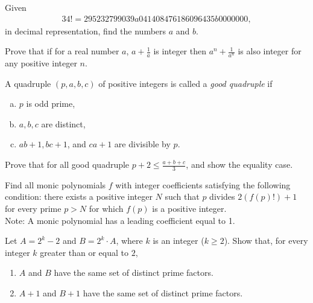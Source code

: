 \documentclass[problems.tex]{subfile}
\begin{document}
	
	
	\begin{problem}
		Given  
		\begin{align*}
			34!=295232799039a041408476186096435b0000000,
		\end{align*}
		in decimal representation, find the numbers $a$ and $b$. %
	\end{problem}
	
	
	
	\begin{problem}
		Prove that if for a real number $a $, $a+\frac {1}{a} $ is integer then $a^n+\frac {1}{a^n} $ is also integer for any positive integer $n$. %
	\end{problem}
	
	
	
	\begin{problem}
		A quadruple $(p,a,b,c)$ of positive integers is called a \textit{good quadruple} if 
		\begin{enumerate}[(a)]
			\item $p $ is odd prime,
			\item $a,b,c $ are distinct,
			\item $ab+1,bc+1$, and $ca+1$ are divisible by $p$.
		\end{enumerate}
		Prove that for all good quadruple $p+2\le \frac {a+b+c}{3} $, and show the equality case. %
	\end{problem}
	
	
	
	\begin{problem}[Balkan 2016]
		Find all monic polynomials $f$ with integer coefficients satisfying the following condition: there exists a positive integer $N$ such that $p$ divides $2(f(p)!)+1$ for every prime $p>N$ for which $f(p)$ is a positive integer.
		\\
		Note: A monic polynomial has a leading coefficient equal to 1. %
	\end{problem}
	
	
	
	\begin{problem}
		Let $A=2^k - 2$ and $B= 2^k \cdot A$, where $k$ is an integer ($k \ge 2$).
		Show that, for every integer $k$ greater than or equal to $2$,
		\begin{enumerate}
			\item $A$ and $B$ have the same set of distinct prime factors.
			\item $A+1$ and $B+1$ have the same set of distinct prime factors.
		\end{enumerate}
	\end{problem}
	
\end{document}
